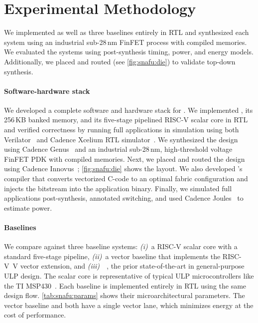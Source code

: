 \section{Experimental Methodology}
\label{snafu:method}

\figSNAFUDie
\tabSNAFUTabs

We implemented \snafuarch as well as three baselines entirely in RTL and synthesized each system using
an industrial sub-28\,nm FinFET process with compiled memories.
% 
We evaluated the systems using post-synthesis timing, power, and energy models.
% 
Additionally, we placed and routed \snafuarch (see \autoref{fig:snafu:die}) to validate top-down synthesis.

\paragraph{Software-hardware stack}
We developed a complete software and hardware stack for \snafu.
% 
We implemented \snafuarch, its 256\,KB banked memory, and its five-stage pipelined \mbox{RISC-V} scalar core in RTL and verified correctness by running full applications in simulation using both Verilator~\cite{snyder2004verilator} and Cadence Xcelium RTL simulator~\cite{xcelium}.
% 
We synthesized the design using Cadence Genus~\cite{genus} and an industrial sub-28\,nm, high-threshold voltage FinFET PDK with compiled memories.
% 
Next, we placed and routed the design using Cadence Innovus~\cite{innovus};
% 
\autoref{fig:snafu:die} shows the layout.
% 
We also developed \snafuframe's compiler that converts vectorized C-code to an optimal fabric configuration and injects the bitstream into the application binary.
% 
Finally, we simulated full applications post-synthesis, annotated switching, and
used Cadence Joules~\cite{joules} to estimate power.

\paragraph{Baselines}
We compare \snafuarch against three baseline systems:
\emph{(i)}~a RISC-V scalar core with a standard five-stage pipeline,
\emph{(ii)}~a vector baseline that implements the \mbox{RISC-V V} vector extension,
and \emph{(iii)}~\manic~\cite{manic}, the prior state-of-the-art in general-purpose ULP design.
%
The scalar core is representative of typical ULP microcontrollers like the TI MSP430~\cite{msp430fr5994}.
% 
Each baseline is implemented entirely in RTL using the same design flow. 
%
\autoref{tab:snafu:params} shows their microarchitectural parameters.
%
The vector baseline and \manic both have a single vector lane, which minimizes energy at the cost of performance.

